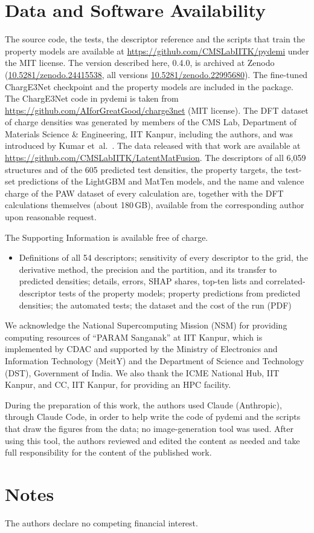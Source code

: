 \documentclass[journal=jctcce,manuscript=article,email=true]{achemso}
\newcommand{\rev}[1]{{\color{blue}#1}}
\begin{document}
\section*{Data and Software Availability}
The source code, the tests, the descriptor reference and the scripts that train
the property models are available at \url{https://github.com/CMSLabIITK/pydemi}
under the MIT license. The version described here, \rev{0.4.0}, is archived at Zenodo
(\rev{\href{https://doi.org/10.5281/zenodo.24415538}{10.5281/zenodo.24415538}}, all
versions \href{https://doi.org/10.5281/zenodo.22995680}{10.5281/zenodo.22995680}).
The fine-tuned ChargE3Net checkpoint and the property models are included in the
package. The ChargE3Net code in pydemi is taken from
\url{https://github.com/AIforGreatGood/charge3net} (MIT license). The DFT dataset
of charge densities was generated by members of the CMS Lab, Department of
Materials Science \& Engineering, IIT Kanpur, including the authors, and was
introduced by Kumar et~al.~\cite{kumar2026}. The data released with that work are
available at \url{https://github.com/CMSLabIITK/LatentMatFusion}. The descriptors
of all 6,059 structures and of the 605 predicted test densities, the property
targets, the test-set predictions of the LightGBM and MatTen models, and the name
and valence charge of the PAW dataset of every calculation \rev{are, together
with the DFT calculations themselves (about 180\,GB), available from the
corresponding author upon reasonable request.}

\begin{suppinfo}
The Supporting Information is available free of charge.
\begin{itemize}
\item Definitions of all 54 descriptors; sensitivity of every descriptor to the grid, the
derivative method, the precision and the partition, and its transfer to predicted densities;
details, errors, SHAP shares, top-ten lists and correlated-descriptor tests of the property
models; property predictions from predicted densities; the automated tests; the dataset
and the cost of the run (PDF)
\end{itemize}
\end{suppinfo}

\begin{acknowledgement}
We acknowledge the National Supercomputing Mission (NSM) for providing
computing resources of ``PARAM Sanganak'' at IIT Kanpur, which is implemented
by CDAC and supported by the Ministry of Electronics and Information Technology
(MeitY) and the Department of Science and Technology (DST), Government of
India. We also thank the ICME National Hub, IIT Kanpur, and CC, IIT Kanpur, for
providing an HPC facility.

During the preparation of this work, the authors used Claude (Anthropic),
through Claude Code, in order to help write the code of pydemi and the scripts
that \rev{draw the figures from the data; no image-generation tool was used}.
After using this tool, the authors reviewed and edited the content as needed and
take full responsibility for the content of the published work.
\end{acknowledgement}

\section*{Notes}
The authors declare no competing financial interest.


\end{document}
